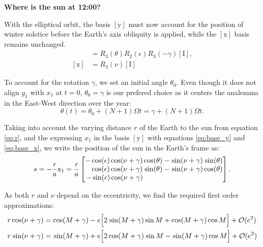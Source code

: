\documentclass[12pt]{article}
\newcommand{\Sin}{%
  \mathop{\sbox0{$\cos$}\makebox[\wd0][r]{$\sin$}}%
}
\begin{document}
\pagebreak
\textbf{Where is the sun at 12:00?}

With the elliptical orbit, the basis $[\mathrm{y}]$ must now account for the
position of winter solstice before the Earth's axis obliquity is applied,
while the $[\mathrm{x}]$ basis remains unchanged.
\begin{align}
    [\mathrm{y}] &= R_3(\theta) R_2(\epsilon) R_3(-\gamma) [\mathrm{I}],
    \label{eq:base_y}\\
    [\mathrm{x}] &= R_3(\nu) [\mathrm{I}]\label{eq:base_x}
\end{align}

To account for the rotation $\gamma$, we set an initial angle $\theta_0$.
Even though it does not align $y_1$ with $x_1$ at $t=0$, 
$\theta_0=\gamma$ is our prefered choice as it centers the analemma 
in the East-West direction over the year:
\begin{equation}
    \theta(t)=\theta_0+(N+1)\Omega t= \gamma + (N+1)\Omega t.
\end{equation}

Taking into account the varying distance $r$ of the Earth to the sun from 
equation \eqref{eq:r}, and the expressing $x_1$ in the basis $[\mathrm{y}]$
with equations \eqref{eq:base_y} and \eqref{eq:base_x},
we write the position of the sun in the Earth's frame as:
\begin{equation}
    s = -\frac{r}{a} \mathrm{x}_1 =
    \frac{r}{a}\begin{bmatrix}
        -\cos(\epsilon)\cos(\nu+\gamma)\cos(\theta) - \Sin(\nu+\gamma)\Sin(\theta)\\
        \phantom{+}\cos(\epsilon)\cos(\nu+\gamma)\Sin(\theta)-\Sin(\nu+\gamma) \cos(\theta)\\
        -\sin(\epsilon)\cos(\nu+\gamma)\phantom{\Sin(\theta)+\Sin(\nu+\gamma) \cos(\theta)}
    \end{bmatrix}.
    \label{eq:positionEllipse}
\end{equation}

As both $r$ and $\nu$ depend on the eccentricity, we find the required 
first order approximations:
\begin{align}
    r \cos (\nu+\gamma) &= \cos(M+\gamma) - e\Big[
        2\Sin(M+\gamma) \sin M + \cos(M+\gamma)\cos M
    \Big] + \mathcal{O}(e^2)\\
    r \Sin (\nu+\gamma) &= \Sin(M+\gamma) + e\Big[
        2\cos(M+\gamma) \Sin M - \Sin(M+\gamma)\cos M
    \Big] + \mathcal{O}(e^2)
\end{align}
\end{document}
